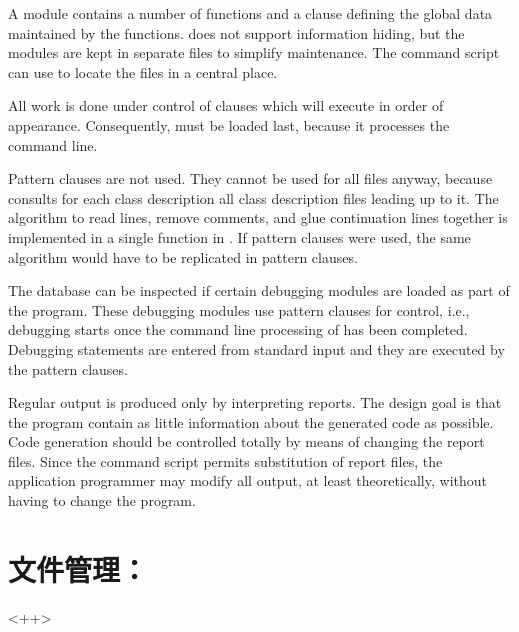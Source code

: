 A module contains a number of functions and a  clause defining
the global data maintained by the functions.  does not support
information hiding, but the modules are kept in separate files to simplify
maintenance. The  command script can use  to locate
the files in a central place.

All work is done under control of  clauses which 
will execute in order of appearance. Consequently,  must be
loaded last, because it processes the  command line.

Pattern clauses are not used. They cannot be used for all files anyway,
because  consults for each class description all class
description files leading up to it. The algorithm to read lines, remove
comments, and glue continuation lines together is implemented in a single
function  in . If pattern clauses were used, the
same algorithm would have to be replicated in pattern clauses.

The database can be inspected if certain debugging modules are loaded as
part of the  program. These debugging modules use pattern clauses
for control, i.e., debugging starts once the command line processing of
 has been completed. Debugging statements are entered from
standard input and they are executed by the pattern clauses.

Regular output is produced only by interpreting reports. The design goal is
that the  program contain as little information about the
generated code as possible. Code generation should be controlled totally by
means of changing the report files. Since the  command script
permits substitution of report files, the application programmer may modify
all output, at least theoretically, without having to change the 
program.

\section{文件管理：}
<++>

